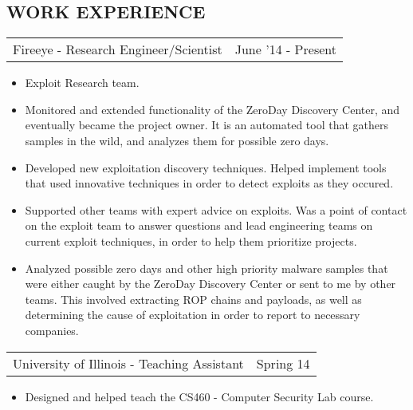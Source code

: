 \documentclass[margin]{res}
\begin{document}
\begin{resume}
\section{WORK EXPERIENCE}
\begin{tabular}{p{3in} r} %
                 Fireeye - Research Engineer/Scientist &  June '14 - Present
                  \end{tabular}
                   \begin{itemize} \itemsep -2pt %
                     \item Exploit Research team.
                     \item Monitored and extended functionality of the ZeroDay Discovery Center, and eventually
                     became the project owner.  It is an automated tool that gathers samples in the wild, and
                     analyzes them for possible zero days.
                     \item Developed new exploitation discovery techniques.  Helped implement tools that used 
                     innovative techniques in order to detect exploits as they occured.
                     \item Supported other teams with expert advice on exploits.  Was a point of contact on the
                     exploit team to answer questions and lead engineering teams on current exploit techniques,
                     in order to help them prioritize projects.
                     \item Analyzed possible zero days and other high priority malware samples that were either
                     caught by the ZeroDay Discovery Center or sent to me by other teams.  This involved extracting
                     ROP chains and payloads, as well as determining the cause of exploitation in order to report
                     to necessary companies.
		   \end{itemize}
\begin{tabular}{p{3in} r} %
                  University of Illinois - Teaching Assistant&  Spring 14
                  \end{tabular}
                   \begin{itemize} \itemsep -2pt %
                     \item Designed and helped teach the CS460 - Computer Security Lab course.

\end{itemize}
\end{resume}
\end{document}
